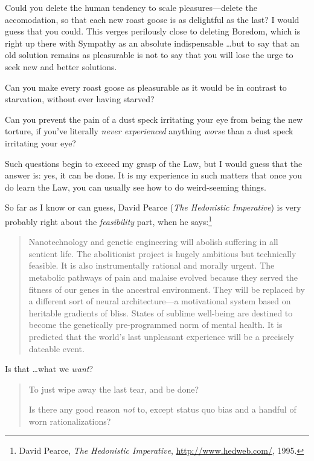 {
 Could you delete the human tendency to scale pleasures---delete
the accomodation, so that each new roast goose is as delightful as the
last? I would guess that you could. This verges perilously close to
deleting Boredom, which is right up there with Sympathy as an absolute
indispensable \ldots but to say that an old solution remains as
pleasurable is not to say that you will lose the urge to seek new and
better solutions.}

{
 Can you make every roast goose as pleasurable as it would be in
contrast to starvation, without ever having starved?}

{
 Can you prevent the pain of a dust speck irritating your eye from
being the new torture, if you've literally
\textit{never experienced} anything \textit{worse} than a dust speck
irritating your eye?}

{
 Such questions begin to exceed my grasp of the Law, but I would
guess that the answer is: yes, it can be done. It is my experience in
such matters that once you do learn the Law, you can usually see how to
do weird-seeming things.}

{
 So far as I know or can guess, David Pearce (\textit{The
Hedonistic Imperative}) is very probably right about the
\textit{feasibility} part, when he says:\footnote{David Pearce, \textit{The Hedonistic Imperative},
\url{http://www.hedweb.com/}, 1995.}}

\begin{quote}
{
 Nanotechnology and genetic engineering will abolish suffering in
all sentient life. The abolitionist project is hugely ambitious but
technically feasible. It is also instrumentally rational and morally
urgent. The metabolic pathways of pain and malaise evolved because they
served the fitness of our genes in the ancestral environment. They will
be replaced by a different sort of neural architecture---a motivational
system based on heritable gradients of bliss. States of sublime
well-being are destined to become the genetically pre-programmed norm
of mental health. It is predicted that the world's last
unpleasant experience will be a precisely dateable event.}
\end{quote}

{
 Is that \ldots what we \textit{want}?}

\begin{quote}
{
 To just wipe away the last tear, and be done?}

{
 Is there any good reason \textit{not} to, except status quo bias
 and a handful of worn rationalizations?}
\end{quote}

